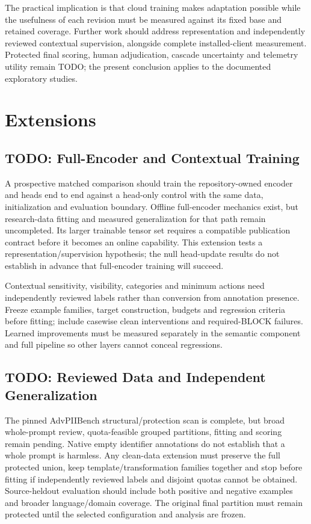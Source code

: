 \documentclass[conference]{IEEEtran}
\begin{document}
The practical implication is that cloud training makes adaptation possible while the usefulness of each revision must be measured against its fixed base and retained coverage. Further work should address representation and independently reviewed contextual supervision, alongside complete installed-client measurement. Protected final scoring, human adjudication, cascade uncertainty and telemetry utility remain TODO; the present conclusion applies to the documented exploratory studies.

\section{Extensions}
\label{sec:extensions}

\subsection{TODO: Full-Encoder and Contextual Training}

A prospective matched comparison should train the repository-owned encoder and heads end to end against a head-only control with the same data, initialization and evaluation boundary. Offline full-encoder mechanics exist, but research-data fitting and measured generalization for that path remain uncompleted. Its larger trainable tensor set requires a compatible publication contract before it becomes an online capability. This extension tests a representation/supervision hypothesis; the null head-update results do not establish in advance that full-encoder training will succeed.

Contextual sensitivity, visibility, categories and minimum actions need independently reviewed labels rather than conversion from annotation presence. Freeze example families, target construction, budgets and regression criteria before fitting; include casewise clean interventions and required-BLOCK failures. Learned improvements must be measured separately in the semantic component and full pipeline so other layers cannot conceal regressions.

\subsection{TODO: Reviewed Data and Independent Generalization}

The pinned AdvPIIBench structural/protection scan is complete, but broad whole-prompt review, quota-feasible grouped partitions, fitting and scoring remain pending. Native empty identifier annotations do not establish that a whole prompt is harmless. Any clean-data extension must preserve the full protected union, keep template/transformation families together and stop before fitting if independently reviewed labels and disjoint quotas cannot be obtained. Source-heldout evaluation should include both positive and negative examples and broader language/domain coverage. The original final partition must remain protected until the selected configuration and analysis are frozen.
\end{document}
